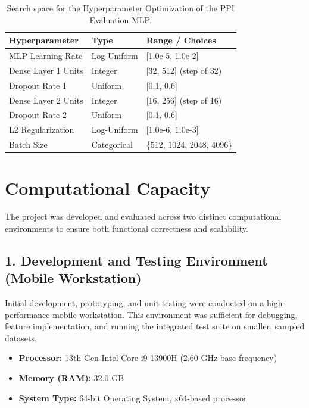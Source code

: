 \documentclass[utf8]{frontiers_suppmat}
\begin{document}
	\begin{table}[H]
		\centering
		\caption{Search space for the Hyperparameter Optimization of the PPI Evaluation MLP.}
		\label{tab:hpo_space}
		\begin{tabular}{lll}
			\toprule
			\textbf{Hyperparameter} & \textbf{Type} & \textbf{Range / Choices} \\
			\midrule
			MLP Learning Rate & Log-Uniform & [1.0e-5, 1.0e-2] \\
			Dense Layer 1 Units & Integer & [32, 512] (step of 32) \\
			Dropout Rate 1 & Uniform & [0.1, 0.6] \\
			Dense Layer 2 Units & Integer & [16, 256] (step of 16) \\
			Dropout Rate 2 & Uniform & [0.1, 0.6] \\
			L2 Regularization & Log-Uniform & [1.0e-6, 1.0e-3] \\
			Batch Size & Categorical & \{512, 1024, 2048, 4096\} \\
			\bottomrule
		\end{tabular}
	\end{table}
	
	
\section*{Computational Capacity}

The project was developed and evaluated across two distinct computational environments to ensure both functional correctness and scalability.

\subsection*{1. Development and Testing Environment (Mobile Workstation)}

Initial development, prototyping, and unit testing were conducted on a high-performance mobile workstation. This environment was sufficient for debugging, feature implementation, and running the integrated test suite on smaller, sampled datasets.
\begin{itemize}
	\item \textbf{Processor:} 13th Gen Intel\textregistered{} Core\texttrademark{} i9-13900H (2.60 GHz base frequency)
	\item \textbf{Memory (RAM):} 32.0 GB
	\item \textbf{System Type:} 64-bit Operating System, x64-based processor
\end{itemize}
\end{document}
